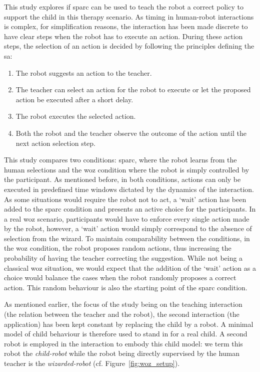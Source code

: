This study explores if \gls{sparc} can be used to teach the robot a correct policy to support the child in this therapy scenario. As timing in human-robot interactions is complex, for simplification reasons, the interaction has been made discrete to have clear steps when the robot has to execute an action. During these action steps, the selection of an action is decided by following the principles defining the \gls{sa}:
\begin{enumerate}
	\item The robot suggests an action to the teacher.
	\item The teacher can select an action for the robot to execute or let the proposed action be executed after a short delay.
	\item The robot executes the selected action.
	\item Both the robot and the teacher observe the outcome of the action until the next action selection step.
\end{enumerate}

This study compares two conditions: \gls{sparc}, where the robot learns from the human selections and the \gls{woz} condition where the robot is simply controlled by the participant. As mentioned before, in both conditions, actions can only be executed in predefined time windows dictated by the dynamics of the interaction. As some situations would require the robot not to act, a `wait' action has been added to the \gls{sparc} condition and presents an active choice for the participants. 
In a real \gls{woz} scenario, participants would have to enforce every single action made by the robot, however, a `wait' action would simply correspond to the absence of selection from the wizard. To maintain comparability between the conditions, in the \gls{woz} condition, the robot proposes random actions, thus increasing the probability of having the teacher correcting the suggestion. While not being a classical \gls{woz} situation, we would expect that the addition of the `wait' action as a choice would balance the cases when the robot randomly proposes a correct action. This random behaviour is also the starting point of the \gls{sparc} condition.

As mentioned earlier, the focus of the study being on the teaching interaction (the relation between the teacher and the robot), the second interaction (the application) has been kept constant by replacing the child by a robot. A minimal model of child behaviour is therefore used to stand in for a real child. A second robot is employed in the interaction to embody this child model: we term this robot the \textit{child-robot} while the robot being directly supervised by the human teacher is the \textit{wizarded-robot} (cf. Figure~\ref{fig:woz_setup}).

